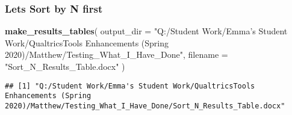 \documentclass[
]{article}
\newenvironment{Shaded}{\begin{snugshade}}{\end{snugshade}}
\newcommand{\DataTypeTok}[1]{\textcolor[rgb]{0.13,0.29,0.53}{#1}}
\newcommand{\KeywordTok}[1]{\textcolor[rgb]{0.13,0.29,0.53}{\textbf{#1}}}
\newcommand{\NormalTok}[1]{#1}
\newcommand{\StringTok}[1]{\textcolor[rgb]{0.31,0.60,0.02}{#1}}
\begin{document}
\hypertarget{lets-sort-by-n-first}{%
\subsubsection{Lets Sort by N first}\label{lets-sort-by-n-first}}

\begin{Shaded}
\begin{Highlighting}[]
\KeywordTok{make_results_tables}\NormalTok{(}
  \DataTypeTok{output_dir =} \StringTok{"Q:/Student Work/Emma's Student Work/QualtricsTools Enhancements (Spring 2020)/Matthew/Testing_What_I_Have_Done"}\NormalTok{,}
  \DataTypeTok{filename =} \StringTok{"Sort_N_Results_Table.docx"}
\NormalTok{)}
\end{Highlighting}
\end{Shaded}

\begin{verbatim}
## [1] "Q:/Student Work/Emma's Student Work/QualtricsTools Enhancements (Spring 2020)/Matthew/Testing_What_I_Have_Done/Sort_N_Results_Table.docx"
\end{verbatim}
\end{document}
